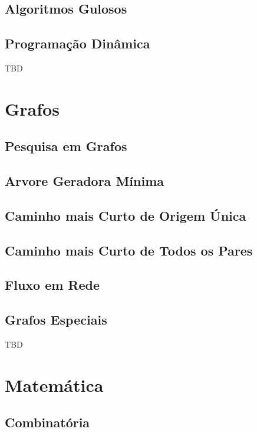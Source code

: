 \documentclass[11pt]{scrartcl}
\begin{document}
\subsection{Algoritmos Gulosos}

\subsection{Programação Dinâmica}

TBD


\section{Grafos}

\subsection{Pesquisa em Grafos}

\subsection{Arvore Geradora Mínima}

\subsection{Caminho mais Curto de Origem Única}

\subsection{Caminho mais Curto de Todos os Pares}

\subsection{Fluxo em Rede}

\subsection{Grafos Especiais}

TBD


\section{Matemática}

\subsection{Combinatória}
\end{document}
